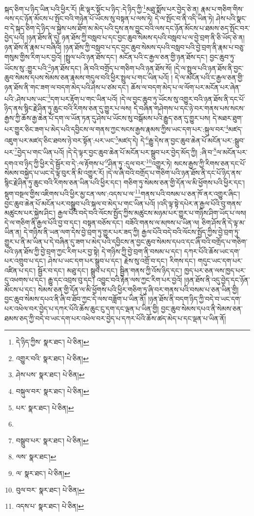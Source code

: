 སྐད་ཅིག་པ་ཉིད་ཡིན་པའི་ཕྱིར་རོ། །ཇི་ལྟར་སྟོང་པ་ཉིད་:དེ་ཉིད་ཀྱི་\footnote{དེ་ཉིད་ཀྱིས་  སྣར་ཐང་།  པེ་ཅིན། }མཐུ་སྨོས་པར་བྱེད་ཅེ་ན། རྣམ་པ་གཅིག་གིས་ལས་དང་ཉོན་མོངས་པ་སྤོང་བའི་གཉེན་པོ་ཡོངས་སུ་བསྟན་པ་ལས་ཏེ། དེ་ལ་སྤོང་བ་ནི་འདི་ཡིན་ཏེ། ཤེས་པའི་སྣང་བ་དེ་སྐད་ཅིག་དེ་ཉིད་ལ་སྐྱེས་པས་ཐོག་མ་མེད་པའི་དུས་ནས་བྱུང་བའི་ལས་དང་ཉོན་མོངས་པ་ཐམས་ཅད་སྤོང་བར་བྱེད་པའོ། །ཉན་ཐོས་ནི་དུ། ཉན་ཐོས་ཀྱི་བསླབ་པ་དང་བྱང་ཆུབ་སེམས་དཔའི་བསླབ་པ་ལ་བྱེ་བྲག་ནི་ཅི་ཡོད་ཅེ་ན། ཉན་ཐོས་ནི་རྣམ་པ་བཞིའོ། །ཉན་ཐོས་ཀྱི་བསླབ་པ་དང་བྱང་ཆུབ་སེམས་དཔའི་བསླབ་པའི་བྱེ་བྲག་ནི་རྣམ་པ་བཅུ་གསུམ་གྱིས་རིག་པར་བྱའོ། །སྤྲུལ་པའི་ཉན་ཐོས་དང་། མངོན་པའི་ང་རྒྱལ་ཅན་གྱི་ཉན་ཐོས་དང་། བྱང་ཆུབ་ཏུ་ཡོངས་སུ་:གྱུར་པའི་\footnote{འགྱུར་བའི་  སྣར་ཐང་།  པེ་ཅིན། }ཉན་ཐོས་དང་། ཞི་བའི་བགྲོད་པ་གཅིག་པའི་ཉན་ཐོས་སོ། །དེ་ལ་སྤྲུལ་པའི་ཉན་ཐོས་ནི་བྱང་ཆུབ་སེམས་དཔས་སེམས་ཅན་རྣམས་གདུལ་བའི་ཕྱིར་སྤྲུལ་པ་གང་ཡིན་པའོ། །
དེ་ལ་མངོན་པའི་ང་རྒྱལ་ཅན་གྱི་ཉན་ཐོས་ནི་གང་ཟག་ལ་བདག་མེད་པའི་ཤེས་པ་ཙམ་དང་། ཆོས་ལ་བདག་མེད་པ་ལ་ལོག་པར་མངོན་པར་ཞེན་པའི་:ཤེས་པས་ཡང་\footnote{ཤེས་པས་  སྣར་ཐང་།  པེ་ཅིན། }དག་པར་རྟོག་པ་གང་ཡིན་པའོ། །དེ་ལ་བྱང་ཆུབ་ཏུ་ཡོངས་སུ་འགྱུར་བའི་ཉན་ཐོས་ནི་དང་པོ་ཉིད་ནས་སྙིང་རྗེ་ཤིན་ཏུ་ཆུང་བའི་རིགས་ཅན་དུ་གྱུར་པ་ལས། དེ་བཞིན་གཤེགས་པ་དང་ཉེ་བར་གནས་པས་སངས་རྒྱས་ཀྱི་ཆོས་རྒྱ་ཆེན་པོ་དག་ལ་ཡོན་ཏན་དུ་ཤེས་པ་ཡོངས་སུ་བསྒོམས་པའི་རྒྱུད་ཅན་དུ་གྱུར་པས། དེ་མཐར་ཐུག་པར་གྱུར་ཅིང་ཟག་པ་མེད་པའི་དབྱིངས་ལ་གནས་ཀྱང་སངས་རྒྱས་རྣམས་ཀྱིས་ཡང་དག་པར་:སྐུལ་བར་\footnote{བསྐུལ་བར་  སྣར་ཐང་།  པེ་ཅིན། }མཛད་འཇུག་པར་མཛད་ཅིང་ཐབས་ཉེ་བར་སྟོན་:པར་ཡང་\footnote{པར་  སྣར་ཐང་།  པེ་ཅིན། }མཛད་དེ། དེ་\footnote{}རྒྱུ་དེས་ན་བྱང་ཆུབ་ཆེན་པོ་མངོན་པར་:སྒྲུབ་པར་\footnote{བསྒྲུབ་པར་  སྣར་ཐང་།  པེ་ཅིན། }བྱེད་པ་གང་ཡིན་པའོ། །དེ་དེ་ལྟར་བྱང་ཆུབ་ཆེན་པོ་མངོན་པར་སྒྲུབ་པར་བྱེད་མོད་ཀྱི། :ཞི་བ་\footnote{ལས་  སྣར་ཐང་། }ལ་མངོན་པར་དགའ་བ་ཉིད་ཀྱི་ཕྱིར་དེ་སྦྱོར་བ་དེ་:ལ་རྟོགས་པ་\footnote{ལ་  སྣར་ཐང་།  པེ་ཅིན། }ཤིན་ཏུ་:དུལ་བར་\footnote{བུལ་བར་  སྣར་ཐང་།  པེ་ཅིན། }འགྱུར་ཏེ། སངས་རྒྱས་ཀྱི་རིགས་ཅན་དང་པོ་སེམས་བསྐྱེད་པ་ཡང་དེ་ལྟ་བུར་ནི་མི་འགྱུར་རོ། །དེ་ལ་ཞི་བའི་བགྲོད་པ་གཅིག་པའི་ཉན་ཐོས་ནི་དང་པོ་ཉིད་ནས་སྙིང་རྗེ་ཤིན་ཏུ་ཆུང་བའི་རིགས་ཅན་ཡིན་པའི་ཕྱིར་དང་། གཅིག་ཏུ་སེམས་ཅན་གྱི་དོན་ལ་མི་ཕྱོགས་པའི་ཕྱིར་དང་། སྡུག་བསྔལ་གྱིས་འཇིགས་པའི་ཕྱིར་མྱ་ངན་ལས་:འདས་པ་ལ་\footnote{འདས་པ་  སྣར་ཐང་།  པེ་ཅིན། }གནས་པའི་བསམ་པ་ཅན་ཁོ་ནར་འགྱུར་ཞིང་། བྱང་ཆུབ་ཆེན་པོ་མངོན་པར་བསྒྲུབ་པའི་སྐལ་བ་མེད་པ་གང་ཡིན་པའོ། །འདི་ལྟ་སྟེ་དཔེར་ན་རྒྱལ་པོའི་བུ་གནས་མཚུངས་པར་སྐྱེས་ཤིང་། རྒྱལ་པོའི་བདེ་བའི་ལོངས་སྤྱོད་ཀྱིས་མཚུངས་མཉམ་པར་གྱུར་པ་གཉིས་ཤིག་ཡོད་པ་ལས། དེ་ལ་གཅིག་ནི་རྒྱལ་པོའི་བྱ་བ་དང་། བསྟན་བཅོས་དང་། བཟོའི་གནས་ལ་མཁས་པ་ཡིན་ལ། ཅིག་ཤོས་ནི་དེ་ལྟ་མ་ཡིན་ན། དེ་གཉིས་ནི་ཡན་ལག་དེས་བྱེ་བྲག་ཏུ་གྱུར་པར་ཟད་ཀྱི། རྒྱལ་པོའི་བདེ་བའི་ལོངས་སྤྱོད་ཀྱིས་བྱེ་བྲག་ཏུ་གྱུར་པ་ནི་མ་ཡིན་པ་དེ་བཞིན་དུ་ཟག་པ་མེད་པའི་དབྱིངས་ན་བྱང་ཆུབ་སེམས་དཔའ་དང་ཞི་བའི་བགྲོད་པ་གཅིག་པའི་ཉན་ཐོས་ཀྱི་བྱེ་བྲག་ཀྱང་རིག་པར་བྱ་སྟེ། དེ་གཉིས་ཀྱི་བྱེ་བྲག་ནི་བསམ་པ་དང་། དཀར་པོའི་ཆོས་ཡང་དག་པར་འགྲུབ་པ་དང་། ཤེས་པ་ཡང་དག་པར་སྒྲུབ་པ་དང་། རྗེས་སུ་འགྲོ་བ་དང་། རིགས་དང་། གདུང་ཡང་དག་པར་འཛིན་པ་དང་། སྦྱོར་བ་དང་། མཐུ་དང་། སྒྲུབ་པ་དང་། སྦྱིན་གནས་ཀྱི་འོས་ཉིད་དང་། ཁྱད་པར་ཅན་ལས་ཁྱད་པར་དུ་འཕགས་པ་དང་། རྒྱུ་དང་འབྲས་བུ་དང་། འབྱུང་བའི་རྟེན་ལས་ཀྱང་རིག་པར་བྱའོ། །ཉན་ཐོས་ནི་འདུ་བྱེད་དང་ཉོན་མོངས་པ་དང་། སེམས་ཅན་གྱི་དོན་ལ་མི་ཕྱོགས་པའི་ཕྱིར་གཅིག་ཏུ་ཞི་བར་གནས་པའི་བསམ་པ་ཅན་ཡིན་གྱི། བྱང་ཆུབ་སེམས་དཔའ་ནི་ཞི་བ་ཐོབ་ཀྱང་དེ་ལས་བཟློག་པ་ཡིན་ནོ། །ཉན་ཐོས་ནི་བདག་ཉིད་ཀྱི་བདེ་བ་ཡང་དག་པར་འཕེལ་བར་བྱེད་པ་དཀར་པོའི་ཆོས་ཆུང་ངུ་དག་དང་ལྡན་པ་ཡིན་གྱི། བྱང་ཆུབ་སེམས་དཔའ་ནི་སེམས་ཅན་ཐམས་ཅད་ཀྱི་བདེ་བ་ཡང་དག་པར་འཕེལ་བར་བྱེད་པ་དཀར་པོའི་ཆོས་ཚད་མེད་པ་དང་ལྡན་པ་ཡིན་ནོ། 